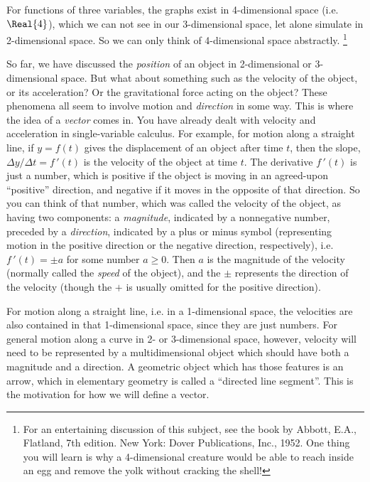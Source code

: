 For functions of three variables, the graphs exist in 4-dimensional space (i.e. $\Real{4}$),
which we can not see in our 3-dimensional space, let alone simulate in 2-dimensional space.  So we
can only think of 4-dimensional space abstractly.  \footnote{For an entertaining discussion of this subject, see the book by
Abbott, E.A., Flatland, 7th edition. New York: Dover Publications, Inc., 1952. One thing you will learn is why a 4-dimensional creature would be able to reach inside an egg and
remove the yolk without cracking the shell!}

So far, we have discussed the \emph{position} of an object in 2-dimensional or 3-dimensional space.
But what about something such as the velocity of the object, or its acceleration?
Or the gravitational force acting on the object? These phenomena all seem to involve motion and \emph{direction} in some
way.  This is where the idea of a \emph{vector} comes in.
\newpage
You have already dealt with velocity and acceleration in single-variable calculus.  For example, for motion along a
straight line, if $y = f(t)$ gives the displacement of an object after time $t$, then the slope, $\Delta y/\Delta t = f\,'(t)$ is the velocity
of the object at time $t$.  The derivative
$f\,'(t)$ is just a number, which is positive if the object is moving in an
agreed-upon ``positive'' direction, and negative if it moves in the opposite of that direction. So you can think of
that number, which was called the velocity of the object, as having two components: a \emph{magnitude}, indicated by
a nonnegative number, preceded by a \emph{direction}, indicated by a plus or minus symbol (representing motion in the
positive direction or the negative direction, respectively), i.e. $f\,'(t) = \pm a$ for some number $a \ge 0$.  Then
$a$ is the magnitude of the velocity (normally called the \emph{speed} of the object), and the $\pm$ represents the
direction of the velocity (though the $+$ is usually omitted for the positive direction).

For motion along a straight line, i.e. in a 1-dimensional space, the velocities are also contained in that
1-dimensional space, since they are just numbers.  For general motion along a curve in 2- or 3-dimensional space,
however, velocity will need to be represented by a multidimensional object which should have both a magnitude and a
direction.  A geometric object which has those features is an arrow, which in elementary geometry is called a
``directed line segment''.  This is the motivation for how we will define a vector.

